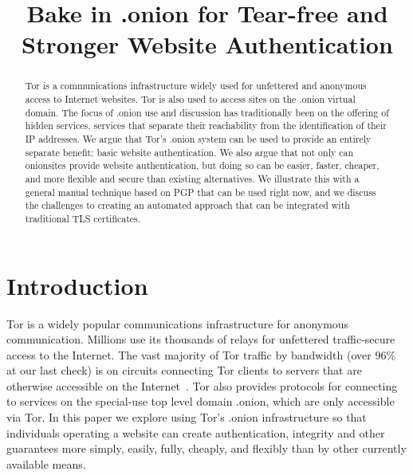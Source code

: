 \documentclass[10pt, conference, compsocconf]{styles/IEEEtran}
\title{Bake in .onion for Tear-free and Stronger Website Authentication}
\author{
\IEEEauthorblockN{Paul Syverson}
\IEEEauthorblockA{U.S. Naval Research Laboratory\\
paul.syverson@nrl.navy.mil}
\and
\IEEEauthorblockN{Griffin Boyce}
\IEEEauthorblockA{Berkman Center for Internet and Society\\
griffin@cryptolab.net}
}
\begin{document}
\maketitle

\begin{abstract}
  Tor is a communications infrastructure widely used for unfettered
  and anonymous access to Internet websites. Tor is also used to
  access sites on the .onion virtual domain.  The focus of .onion use
  and discussion has traditionally been on the offering of hidden
  services, services that separate their reachability from the
  identification of their IP addresses. We argue that Tor's .onion
  system can be used to provide an entirely separate benefit: basic
  website authentication. We also argue that not only can onionsites
  provide website authentication, but doing so can be easier, faster,
  cheaper, and more flexible and secure than existing alternatives.
  We illustrate this with a general manual technique based on PGP
  that can be used right now, and we discuss the challenges to
  creating an automated approach that can be integrated with
  traditional TLS certificates.
\end{abstract}

% 
% 
% 
% 
% 
% 
% 
% 
% 
% 
% 

\section{Introduction}
Tor is a widely popular communications infrastructure for anonymous
communication. Millions use its thousands of relays for unfettered
traffic-secure access to the Internet. The vast majority of Tor
traffic by bandwidth (over 96\% at our last check) is on circuits
connecting Tor clients to servers that are otherwise
accessible on the Internet~\cite{hs-stats-report-2015}. Tor
also provides protocols for connecting to services on the
special-use top level domain .onion, which are only accessible via Tor.
In this paper we explore using Tor's .onion infrastructure so that
individuals operating a website can create authentication, integrity
and other guarantees more simply, easily, fully, cheaply, and flexibly
than by other currently available means.
\end{document}
